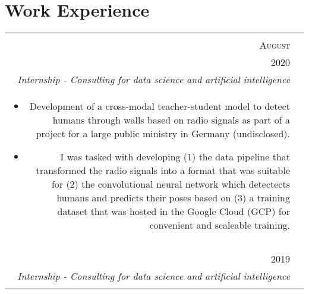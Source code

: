 \documentclass[a4paper,10pt]{article}
\begin{document}
\section{Work Experience}
\begin{tabularx}{\textwidth}{ r | X }

  \begin{tabular}{r}
      \textsc{July \&} \\
      \textsc{August} \\
      \textsc{2020}
  \end{tabular} &

  \begin{tabular}{p{}}
    \textsc{Atos} \\
    \emph{Internship - Consulting for data science and artificial intelligence} \\
    \vspace{-2mm}
    \begin{itemize}[leftmargin=*]

      \item Development of a cross-modal teacher-student model to detect
          humans through walls based on radio signals as part of a project for
          a large public ministry in Germany (undisclosed).

      \item I was tasked with developing (1) the data pipeline that
          transformed the radio signals into a format that was suitable for
          (2) the convolutional neural network which detectects humans and
          predicts their poses based on (3) a training dataset that was hosted
          in the Google Cloud (GCP) for convenient and scaleable training.

    \end{itemize}
    \vspace{-5mm}
  \end{tabular} \\
  \multicolumn{2}{c}{} \\

  \begin{tabular}{r}
      \textsc{Septenmer} \\
      \textsc{2019}
  \end{tabular} &

  \begin{tabular}{p{}}
    \textsc{Atos} \\
    \emph{Internship - Consulting for data science and artificial intelligence}\\
    \footnotesize{
    \vspace{-2mm}
    \begin{itemize}[leftmargin=*]


\end{itemize}}
\end{tabular}
\end{tabularx}
\end{document}
